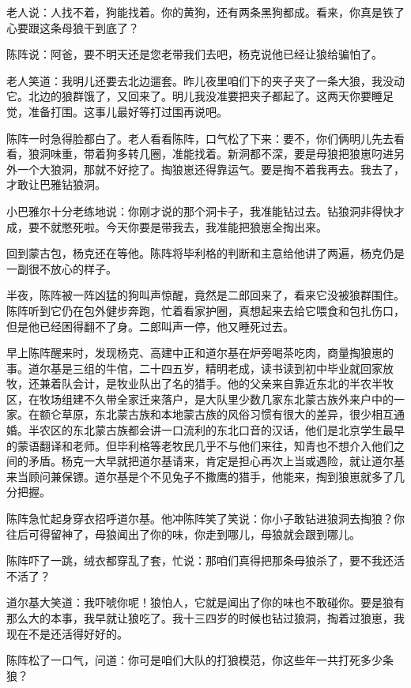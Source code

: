 \par 老人说：人找不着，狗能找着。你的黄狗，还有两条黑狗都成。看来，你真是铁了心要跟这条母狼干到底了？
\par 陈阵说：阿爸，要不明天还是您老带我们去吧，杨克说他已经让狼给骗怕了。
\par 老人笑道：我明儿还要去北边遛套。昨儿夜里咱们下的夹子夹了一条大狼，我没动它。北边的狼群饿了，又回来了。明儿我没准要把夹子都起了。这两天你要睡足觉，准备打围。这事儿最好等打过围再说吧。
\par 陈阵一时急得脸都白了。老人看看陈阵，口气松了下来：要不，你们俩明儿先去看看，狼洞味重，带着狗多转几圈，准能找着。新洞都不深，要是母狼把狼崽叼进另外一个大狼洞，那就不好挖了。掏狼崽还得靠运气。要是掏不着我再去。我去了，才敢让巴雅钻狼洞。
\par 小巴雅尔十分老练地说：你刚才说的那个洞卡子，我准能钻过去。钻狼洞非得快才成，要不就憋死啦。今天你要是带我去，我准能把狼崽全掏出来。
\par 回到蒙古包，杨克还在等他。陈阵将毕利格的判断和主意给他讲了两遍，杨克仍是一副很不放心的样子。
\par 半夜，陈阵被一阵凶猛的狗叫声惊醒，竟然是二郎回来了，看来它没被狼群围住。陈阵听到它仍在包外健步奔跑，忙着看家护圈，真想起来去给它喂食和包扎伤口，但是他已经困得翻不了身。二郎叫声一停，他又睡死过去。
\par 
\par 早上陈阵醒来时，发现杨克、高建中正和道尔基在炉旁喝茶吃肉，商量掏狼崽的事。道尔基是三组的牛倌，二十四五岁，精明老成，读书读到初中毕业就回家放牧，还兼着队会计，是牧业队出了名的猎手。他的父亲来自靠近东北的半农半牧区，在牧场组建不久带全家迁来落户，是大队里少数几家东北蒙古族外来户中的一家。在额仑草原，东北蒙古族和本地蒙古族的风俗习惯有很大的差异，很少相互通婚。半农区的东北蒙古族都会讲一口流利的东北口音的汉话，他们是北京学生最早的蒙语翻译和老师。但毕利格等老牧民几乎不与他们来往，知青也不想介入他们之间的矛盾。杨克一大早就把道尔基请来，肯定是担心再次上当或遇险，就让道尔基来当顾问兼保镖。道尔基是个不见兔子不撒鹰的猎手，他能来，掏到狼崽就多了几分把握。
\par 陈阵急忙起身穿衣招呼道尔基。他冲陈阵笑了笑说：你小子敢钻进狼洞去掏狼？你往后可得留神了，母狼闻出了你的味，你走到哪儿，母狼就会跟到哪儿。
\par 陈阵吓了一跳，绒衣都穿乱了套，忙说：那咱们真得把那条母狼杀了，要不我还活不活了？
\par 道尔基大笑道：我吓唬你呢！狼怕人，它就是闻出了你的味也不敢碰你。要是狼有那么大的本事，我早就让狼吃了。我十三四岁的时候也钻过狼洞，掏着过狼崽，我现在不是还活得好好的。
\par 陈阵松了一口气，问道：你可是咱们大队的打狼模范，你这些年一共打死多少条狼？
